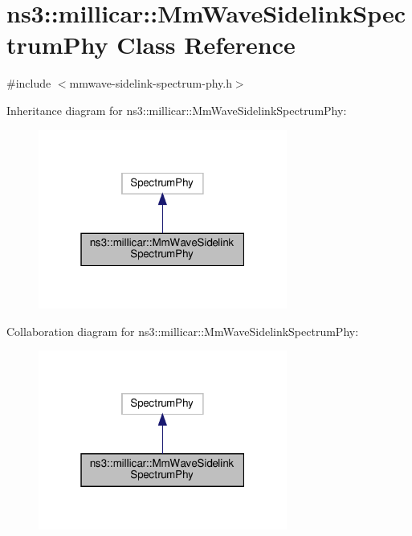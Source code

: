 \hypertarget{classns3_1_1millicar_1_1MmWaveSidelinkSpectrumPhy}{}\section{ns3\+:\+:millicar\+:\+:Mm\+Wave\+Sidelink\+Spectrum\+Phy Class Reference}
\label{classns3_1_1millicar_1_1MmWaveSidelinkSpectrumPhy}


{\ttfamily \#include $<$mmwave-\/sidelink-\/spectrum-\/phy.\+h$>$}



Inheritance diagram for ns3\+:\+:millicar\+:\+:Mm\+Wave\+Sidelink\+Spectrum\+Phy\+:
\nopagebreak
\begin{figure}[H]
\begin{center}
\leavevmode
\includegraphics[width=232pt]{classns3_1_1millicar_1_1MmWaveSidelinkSpectrumPhy__inherit__graph}
\end{center}
\end{figure}


Collaboration diagram for ns3\+:\+:millicar\+:\+:Mm\+Wave\+Sidelink\+Spectrum\+Phy\+:
\nopagebreak
\begin{figure}[H]
\begin{center}
\leavevmode
\includegraphics[width=232pt]{classns3_1_1millicar_1_1MmWaveSidelinkSpectrumPhy__coll__graph}
\end{center}
\end{figure}
